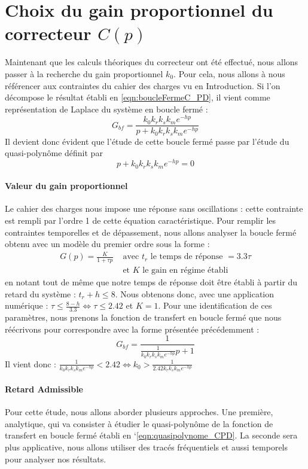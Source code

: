 \section{Choix du gain proportionnel du correcteur $C(p)$}
Maintenant que les calculs théoriques du correcteur ont été effectué, nous allons passer à la recherche du gain proportionnel $k_0$. Pour cela, nous allons à nous référencer aux contraintes du cahier des charges vu en Introduction. Si l'on décompose le résultat établi en \ref{eqn:boucleFermeC_PD}, il vient comme représentation de Laplace du système en boucle fermé :
\begin{equation}
G_{bf} = \frac{k_0k_rk_sk_me^{-hp}}{p+k_0k_rk_sk_me^{-hp}}
\end{equation}
Il devient donc évident que l'étude de cette boucle fermé passe par l'étude du quasi-polynôme définit par \begin{equation}\label{eqn:quasipolynome_CPD}
p+k_0k_rk_sk_me^{-hp}=0
\end{equation}

\paragraph*{Valeur du gain proportionnel}
Le cahier des charges nous impose une réponse sans oscillations : cette contrainte est rempli par l'ordre 1 de cette équation caractéristique. Pour remplir les contraintes temporelles et de dépassement, nous allons analyser la boucle fermé obtenu avec un modèle du premier ordre sous la forme : 
\begin{align*}
G(p) = \frac{K}{1+\tau p} &\text{ avec }t_r \text{ le temps de réponse } = 3.3\tau \\& \text{ et } K \text{ le gain en régime établi} 
\end{align*}
en notant tout de même que notre temps de réponse doit être établi à partir du retard du système : $t_r + h \leq 8$. Nous obtenons donc, avec une application numérique : $\tau \leq \frac{8-h}{3.3} \Leftrightarrow \tau \leq 2.42$ et $K=1$. 
Pour une identification de ces paramètres, nous prenons la fonction de transfert en boucle fermé que nous réécrivons pour correspondre avec la forme présentée précédemment : 
\begin{equation}
G_{bf} = \frac{1}{\frac{1}{k_0k_rk_sk_me^{-hp}}p+1}
\end{equation} 
Il vient donc : $\frac{1}{k_0k_rk_sk_me^{-hp}} < 2.42 \Leftrightarrow k_0 > \frac{1}{2.42k_rk_sk_me^{-hp}}$


\paragraph*{Retard Admissible}
Pour cette étude, nous allons aborder plusieurs approches. Une première, analytique, qui va consister à étudier le quasi-polynôme de la fonction de transfert en boucle fermé établi en `\ref{eqn:quasipolynome_CPD}. La seconde sera plus applicative, nous allons utiliser des tracés fréquentiels et aussi temporels pour analyser nos résultats.


